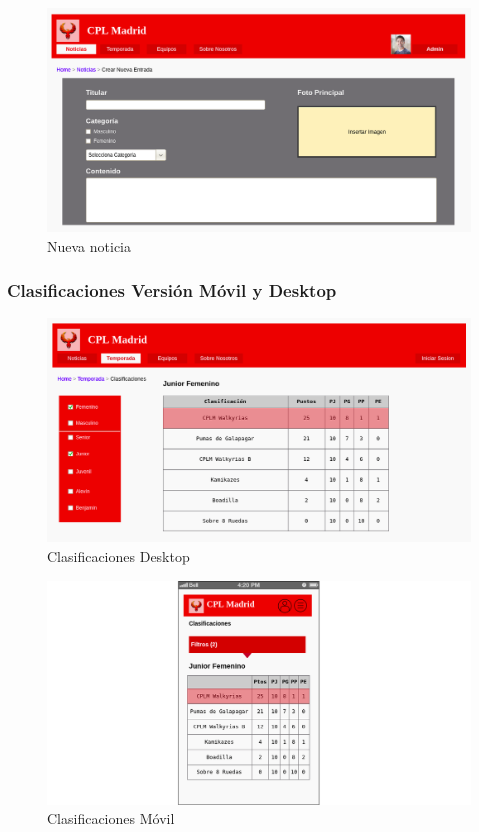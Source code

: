 \documentclass[10pt, spanish, pdftex]{template/UC3M_document}
\begin{document}
  \begin{figure}[H]
    \centering
    \includegraphics [width=18.5cm] {Images/Prototipo/crear_entrada.png}
    \caption{Nueva noticia}
  \end{figure}

  \subsubsection{Clasificaciones Versión Móvil y Desktop}
  \begin{figure}[H]
    \centering
    \includegraphics [width=18.5cm] {Images/Prototipo/clasificaciones.png}
    \caption{Clasificaciones Desktop}
  \end{figure}

  \begin{figure}[H]
    \centering
    \includegraphics [width=18.5cm] {Images/Prototipo/clasificaciones_mvil.png}
    \caption{Clasificaciones Móvil}
  \end{figure}
\end{document}
